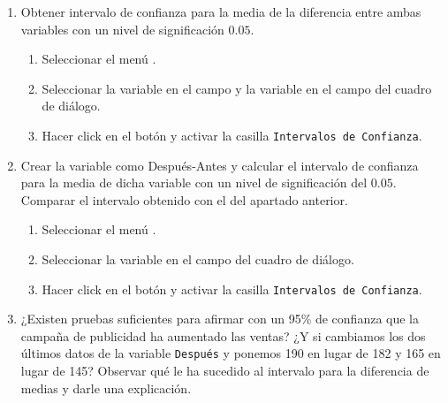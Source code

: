\documentclass[a4paper]{article}
\begin{document}
\begin{enumerate}[leftmargin=*]
\begin {enumerate}
\item Obtener intervalo de confianza para la media de la diferencia entre ambas variables con un nivel de significación $0.05$.
\begin{indicacion}{
\begin{enumerate}
\item Seleccionar el menú .
\item Seleccionar la variable  en el campo  y la variable  en el campo  del cuadro de diálogo.
\item Hacer click en el botón  y activar la casilla \texttt{Intervalos de Confianza}.
\end{enumerate}}
\end{indicacion}

\item Crear la variable  como \textsf{Después-Antes} y calcular el intervalo de confianza para la media de dicha variable con un nivel de significación del $0.05$. Comparar el intervalo obtenido con el del apartado anterior.
\begin{indicacion}{
\begin{enumerate}
\item Seleccionar el menú .
\item Seleccionar la variable  en el campo  del cuadro de diálogo.
\item Hacer click en el botón  y activar la casilla \texttt{Intervalos de Confianza}.
\end{enumerate}}
\end{indicacion} 

\item ¿Existen pruebas suficientes para afirmar con un 95\% de confianza que la campaña de publicidad ha aumentado las ventas? ¿Y si cambiamos los dos últimos datos de la variable \texttt{Después} y ponemos 190 en lugar de 182 y 165 en lugar de 145? Observar qué le ha sucedido al intervalo para la diferencia de medias y darle una explicación.
\end{enumerate}


\end{enumerate}
\end{document}
